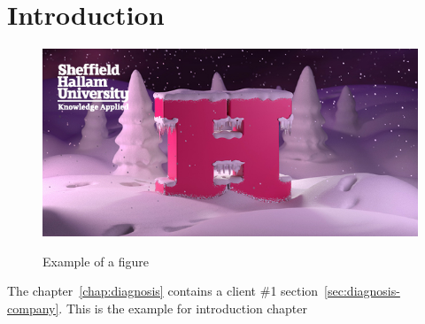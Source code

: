 \chapter{Introduction}

\begin{figure}[!htb]
    \caption{Example of a figure}
    \centering 
    \includegraphics[scale=0.5]{img.png}
    \label{figure:img}
\end{figure}



The chapter~\ref{chap:diagnosis} contains a client \#1 section~\ref{sec:diagnosis-company}.
This is the example for introduction chapter
